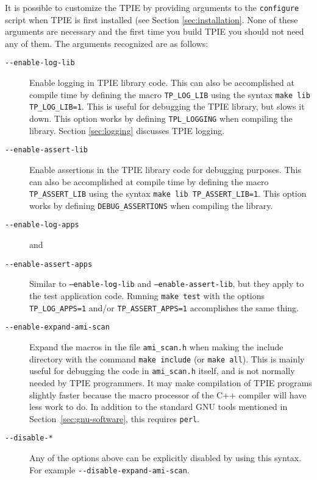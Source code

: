 It is possible to customize the TPIE by providing
arguments to the {\tt configure}
script when TPIE is first installed (see Section \ref{sec:installation}. None of these
 arguments are necessary and the first time you build TPIE
 you should not need any of them. The arguments
recognized are as follows:
\begin{description}
\item[\verb|--enable-log-lib|] 
  Enable logging in TPIE library code.
  This can also be accomplished at compile time by defining the macro
  \verb|TP_LOG_LIB| using the syntax \verb|make lib TP_LOG_LIB=1|.
  This is useful for debugging the TPIE library, but slows it down.
  This option works by defining \verb|TPL_LOGGING|
  when compiling the library. 
  Section \ref{sec:logging} discusses TPIE logging.
\item[\verb|--enable-assert-lib|]  
  Enable assertions in the TPIE library code for debugging purposes.
  This can also be accomplished at compile time by defining the macro
  \verb|TP_ASSERT_LIB| using the syntax \verb|make lib TP_ASSERT_LIB=1|.
  This option works by defining \verb|DEBUG_ASSERTIONS|
  when compiling the library.
\item[\verb|--enable-log-apps|]  and
\item[\verb|--enable-assert-apps|]  
  Similar to {\tt --enable-log-lib} and {\tt --enable-assert-lib}, but
  they apply to the test application code.  Running \verb|make test|
  with the options \verb|TP_LOG_APPS=1| and/or \verb|TP_ASSERT_APPS=1|
  accomplishes the same thing.
\item[\verb|--enable-expand-ami-scan|]  Expand the macros in the file
  \verb|ami_scan.h| when making the include directory with the
command {\tt make include} (or {\tt make all}).  This is mainly useful for
debugging the code in \verb|ami_scan.h| itself, and is not normally
needed by TPIE programmers.  It may make compilation of TPIE programs
slightly faster because the macro processor of the C++ compiler will
have less work to do.  In addition to the standard GNU tools mentioned
in Section~\ref{sec:gnu-software}, this requires \verb|perl|.
\item[\verb|--disable-*|]  Any of the options above can be explicitly
  disabled  by using this syntax.  For example
  \verb|--disable-expand-ami-scan|. 
\end{description}

